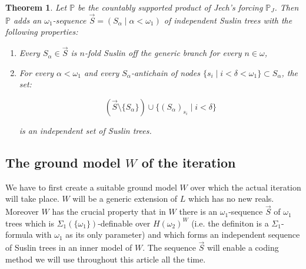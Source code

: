 \documentclass[a4paper,11pt]{article}
\newtheorem{theorem}{Theorem}[section]
\newcommand{\forceP}{\mathbb{P}}
\begin{document}
\begin{theorem}
Let \( \forceP \) be the countably supported product of Jech’s forcing \( \forceP_J \). Then \( \forceP \) adds an \( \omega_1 \)-sequence \( \vec{S} = (S_{\alpha} \mid \alpha < \omega_1) \) of independent Suslin trees with the following properties:
\begin{enumerate}
  \item Every \( S_{\alpha} \in \vec{S} \) is \( n \)-fold Suslin off the generic branch for every \( n \in \omega \),
  \item For every \( \alpha < \omega_1 \) and every \( S_{\alpha} \)-antichain of nodes \( \{ s_i \mid i < \delta < \omega_1 \} \subset S_{\alpha} \), the set:

\[
(\vec{S} \setminus \{ S_{\alpha} \}) \cup \{ (S_{\alpha})_{s_i} \mid i < \delta \}
\]

is an independent set of Suslin trees.
\end{enumerate}
\end{theorem}

\subsection{The ground model $W$ of the iteration}
We have to first create a suitable ground model $W$ over which the actual iteration will take place. $W$ will be a generic extension of $L$ which has no new reals. Moreover $W$ has the crucial property that in $W$ there is an $\omega_1$-sequence $\vec{S}$ of $\omega_1$ trees which is $\Sigma_1(\{\omega_1\})$-definable over $H(\omega_2)^W$ (i.e. the definiton is a $\Sigma_1$-formula with $\omega_1$ as its only parameter) and which forms an independent sequence of Suslin trees in an inner model of $W$. The sequence $\vec{S}$ will enable a coding method we will use throughout this article all the time.
\end{document}
